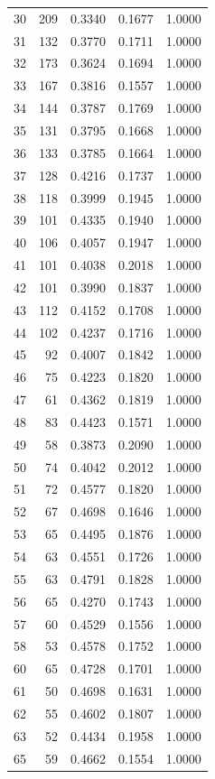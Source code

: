 \begin{table}[h]
\begin{tabular}{rrrrr}
30 & 209 & 0.3340 & 0.1677 & 1.0000 \\
31 & 132 & 0.3770 & 0.1711 & 1.0000 \\
32 & 173 & 0.3624 & 0.1694 & 1.0000 \\
33 & 167 & 0.3816 & 0.1557 & 1.0000 \\
34 & 144 & 0.3787 & 0.1769 & 1.0000 \\
35 & 131 & 0.3795 & 0.1668 & 1.0000 \\
36 & 133 & 0.3785 & 0.1664 & 1.0000 \\
37 & 128 & 0.4216 & 0.1737 & 1.0000 \\
38 & 118 & 0.3999 & 0.1945 & 1.0000 \\
39 & 101 & 0.4335 & 0.1940 & 1.0000 \\
40 & 106 & 0.4057 & 0.1947 & 1.0000 \\
41 & 101 & 0.4038 & 0.2018 & 1.0000 \\
42 & 101 & 0.3990 & 0.1837 & 1.0000 \\
43 & 112 & 0.4152 & 0.1708 & 1.0000 \\
44 & 102 & 0.4237 & 0.1716 & 1.0000 \\
45 & 92 & 0.4007 & 0.1842 & 1.0000 \\
46 & 75 & 0.4223 & 0.1820 & 1.0000 \\
47 & 61 & 0.4362 & 0.1819 & 1.0000 \\
48 & 83 & 0.4423 & 0.1571 & 1.0000 \\
49 & 58 & 0.3873 & 0.2090 & 1.0000 \\
50 & 74 & 0.4042 & 0.2012 & 1.0000 \\
51 & 72 & 0.4577 & 0.1820 & 1.0000 \\
52 & 67 & 0.4698 & 0.1646 & 1.0000 \\
53 & 65 & 0.4495 & 0.1876 & 1.0000 \\
54 & 63 & 0.4551 & 0.1726 & 1.0000 \\
55 & 63 & 0.4791 & 0.1828 & 1.0000 \\
56 & 65 & 0.4270 & 0.1743 & 1.0000 \\
57 & 60 & 0.4529 & 0.1556 & 1.0000 \\
58 & 53 & 0.4578 & 0.1752 & 1.0000 \\
60 & 65 & 0.4728 & 0.1701 & 1.0000 \\
61 & 50 & 0.4698 & 0.1631 & 1.0000 \\
62 & 55 & 0.4602 & 0.1807 & 1.0000 \\
63 & 52 & 0.4434 & 0.1958 & 1.0000 \\
65 & 59 & 0.4662 & 0.1554 & 1.0000 \\
\bottomrule
\end{tabular}
\end{table}
